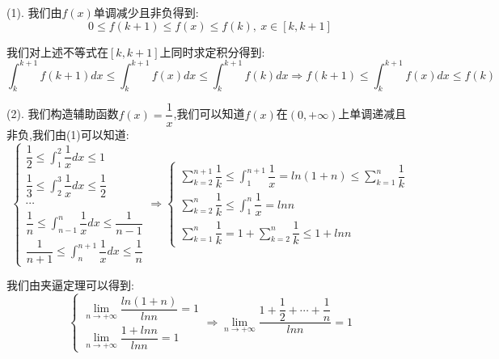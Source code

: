 \begin{solution}
	
	(1). 我们由$f(x)$单调减少且非负得到:  
	$$0\leq f(k+1)\leq f(x)\leq f(k),\ x\in[k,k+1]$$
	
	我们对上述不等式在$[k,k+1]$上同时求定积分得到:  
	$$\int_{k}^{k+1}f(k+1)dx\leq \int_{k}^{k+1}f(x)dx\leq \int_{k}^{k+1}f(k)dx\Rightarrow f(k+1)\leq \int_{k}^{k+1}f(x)dx\leq f(k)$$
	
	(2). 我们构造辅助函数$f(x)=\dfrac{1}{x}$,我们可以知道$f(x)$在$(0,+\infty)$上单调递减且非负,我们由(1)可以知道:  
	$$\left\lbrace
	\begin{array}{l}
		\dfrac{1}{2}\leq \int_{1}^{2}\dfrac{1}{x}dx\leq 1\\
		\dfrac{1}{3}\leq \int_{2}^{3}\dfrac{1}{x}dx\leq \dfrac{1}{2}\\
		\cdots\\
		\dfrac{1}{n}\leq \int_{n-1}^{n}\dfrac{1}{x}dx\leq \dfrac{1}{n-1}\\
		\dfrac{1}{n+1}\leq \int_{n}^{n+1}\dfrac{1}{x}dx\leq \dfrac{1}{n}
	\end{array}
	\right. \Rightarrow \left\lbrace
	\begin{array}{l}
		\sum\limits_{k=2}^{n+1}\dfrac{1}{k}\leq \int_{1}^{n+1}\dfrac{1}{x}=ln(1+n)\leq \sum\limits_{k=1}^{n}\dfrac{1}{k}\\
		\sum\limits_{k=2}^{n}\dfrac{1}{k}\leq \int_{1}^{n}\dfrac{1}{x}=ln n\\
		\sum\limits_{k=1}^{n}\dfrac{1}{k}=1+\sum\limits_{k=2}^{n}\dfrac{1}{k}\leq 1+ln n
	\end{array}
	\right. $$
	
	我们由夹逼定理可以得到:  
	$$\left\lbrace
	\begin{array}{l}
		\lim\limits_{n\rightarrow +\infty}\dfrac{ln(1+n)}{ln n}=1\\
		\lim\limits_{n\rightarrow +\infty}\dfrac{1+ln n}{ln n}=1
	\end{array}
	\right. \Rightarrow \lim\limits_{n\rightarrow  +\infty}\dfrac{1+\dfrac{1}{2}+\cdots+\dfrac{1}{n}}{ln n}=1$$
\end{solution}

